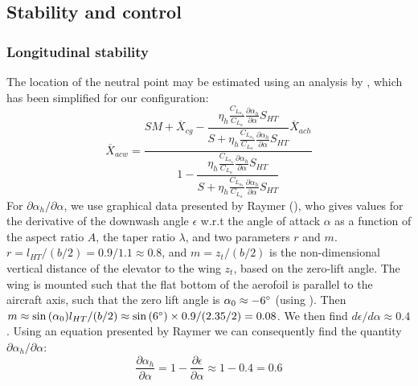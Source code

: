 \subsection{Stability and control}

\subsubsection{Longitudinal stability}
The location of the neutral point may be estimated using an analysis by \cite[p. 417]{raymer}, which has been simplified for our configuration:
\begin{equation}
	\overline{X}_{acw}=\dfrac{SM+\overline{X}_{cg}-\dfrac{\eta_h\frac{C_{L_{\alpha_h}}}{C_{L_\alpha}}\frac{\partial\alpha_h}{\partial\alpha}S_{HT}}{S+\eta_h\frac{C_{L_{\alpha_h}}}{C_{L_\alpha}}\frac{\partial\alpha_h}{\partial\alpha}S_{HT}}\overline{X}_{ach}}{1-\dfrac{\eta_h\frac{C_{L_{\alpha_h}}}{C_{L_\alpha}}\frac{\partial\alpha_h}{\partial\alpha}S_{HT}}{S+\eta_h\frac{C_{L_{\alpha_h}}}{C_{L_\alpha}}\frac{\partial\alpha_h}{\partial\alpha}S_{HT}}}
\end{equation}
For $\partial \alpha_h/\partial \alpha$, we use graphical data presented by Raymer (\cite[pp. 426-427]{raymer}), who gives values for the derivative of the downwash angle $\epsilon$ w.r.t the angle of attack $\alpha$ as a function of the aspect ratio $A$, the taper ratio $\lambda$, and two parameters $r$ and $m$. $r=l_{HT}/(b/2)=0.9/1.1\approx 0.8$, and $m=z_t/(b/2)$ is the non-dimensional vertical distance of the elevator to the wing $z_t$, based on the zero-lift angle. The wing is mounted such that the flat bottom of the aerofoil is parallel to the aircraft axis, such that the zero lift angle is $\alpha_0\approx -6\degree$ (using \cite[p. 83]{airfoildata}). Then $m\approx \sin{(\alpha_0)}l_{HT}/(b/2)\approx \sin{(6\degree)}\times 0.9/(2.35/2)=0.08$. We then find $d\epsilon/d\alpha\approx 0.4$. Using an equation presented by Raymer we can consequently find the quantity $\partial \alpha_h/\partial \alpha$:
\begin{equation}
  \dfrac{\partial\alpha_h}{\partial\alpha}=1-\dfrac{\partial\epsilon}{\partial\alpha}\approx 1-0.4=0.6
\end{equation}

